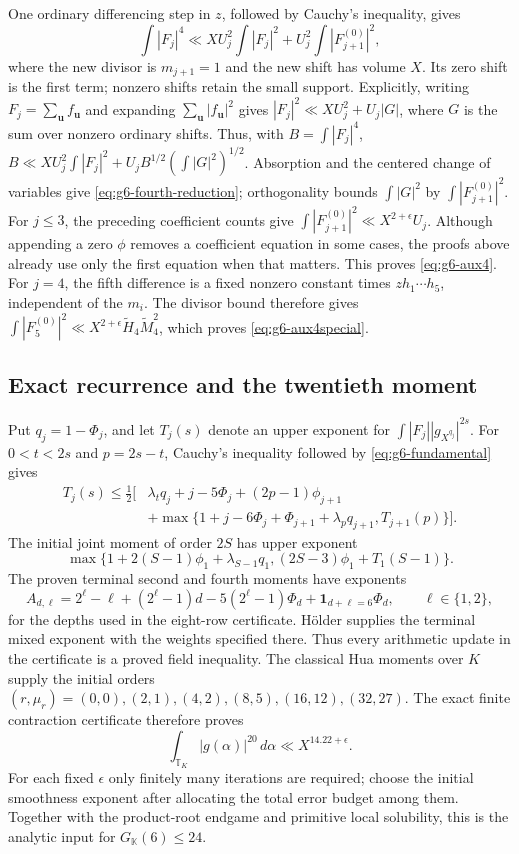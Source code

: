 \documentclass[11pt,reqno]{amsart}
\numberwithin{equation}{section}
\theoremstyle{definition}
\begin{document}
One ordinary differencing step in $z$, followed by Cauchy's inequality, gives
\begin{equation}\label{eq:g6-fourth-reduction}
 \int|F_j|^4\ll XU_j^2\int|F_j|^2
 +U_j^2\int|F_{j+1}^{(0)}|^2,
\end{equation}
where the new divisor is $m_{j+1}=1$ and the new shift has volume $X$.
Its zero shift is the first term; nonzero shifts retain the small support.
Explicitly, writing $F_j=\sum_{\mathbf u}f_{\mathbf u}$ and expanding
$\sum_{\mathbf u}|f_{\mathbf u}|^2$ gives
$|F_j|^2\ll XU_j^2+U_j|G|$, where $G$ is the sum over nonzero ordinary
shifts.  Thus, with $B=\int|F_j|^4$,
$B\ll XU_j^2\int|F_j|^2+U_jB^{1/2}(\int|G|^2)^{1/2}$.
Absorption and the centered change of variables give
\eqref{eq:g6-fourth-reduction}; orthogonality bounds
$\int|G|^2$ by $\int|F_{j+1}^{(0)}|^2$.
For $j\le3$, the preceding coefficient counts give
$\int|F_{j+1}^{(0)}|^2\ll X^{2+\epsilon}U_j$.
Although appending a zero $\phi$ removes a coefficient equation in some cases,
the proofs above already use only the first equation when that matters.
This proves \eqref{eq:g6-aux4}.
For $j=4$, the fifth difference is a fixed nonzero constant times
$zh_1\cdots h_5$, independent of the $m_i$.
The divisor bound therefore gives
$\int|F_5^{(0)}|^2\ll X^{2+\epsilon}\widetilde H_4\widetilde M_4^2$,
which proves \eqref{eq:g6-aux4special}.

\subsection{Exact recurrence and the twentieth moment}

Put $q_j=1-\Phi_j$, and let $T_j(s)$ denote an upper exponent for
$\int|F_j||g_{X^{q_j}}|^{2s}$.
For $0<t<2s$ and $p=2s-t$, Cauchy's inequality followed by
\eqref{eq:g6-fundamental} gives
\begin{align*}
 T_j(s)\le\tfrac12\bigl[&\lambda_tq_j+j-5\Phi_j+(2p-1)\phi_{j+1}\\
 &+\max\{1+j-6\Phi_j+\Phi_{j+1}+\lambda_pq_{j+1},T_{j+1}(p)\}\bigr].
\end{align*}
The initial joint moment of order $2S$ has upper exponent
\[
 \max\{1+2(S-1)\phi_1+\lambda_{S-1}q_1,
             (2S-3)\phi_1+T_1(S-1)\}.
\]
The proven terminal second and fourth moments have exponents
\[
 A_{d,\ell}=2^\ell-\ell+(2^\ell-1)d-5(2^\ell-1)\Phi_d
                +\mathbf1_{d+\ell=6}\Phi_d,
 \qquad\ell\in\{1,2\},
\]
for the depths used in the eight-row certificate.
H\"older supplies the terminal mixed exponent with the weights specified there.
Thus every arithmetic update in the certificate is a proved field inequality.
The classical Hua moments over $K$ supply the initial orders
$(r,\mu_r)=(0,0),(2,1),(4,2),(8,5),(16,12),(32,27)$.
The exact finite contraction certificate therefore proves
\begin{equation}\label{eq:g6-twentieth}
 \int_{\mathbb T_K}|g(\alpha)|^{20}\,d\alpha
 \ll X^{14.22+\epsilon}.
\end{equation}
For each fixed $\epsilon$ only finitely many iterations are required; choose the
initial smoothness exponent after allocating the total error budget among them.
Together with the product-root endgame and primitive local solubility, this is
the analytic input for $G_{\mathbb K}(6)\le24$.
\end{document}
